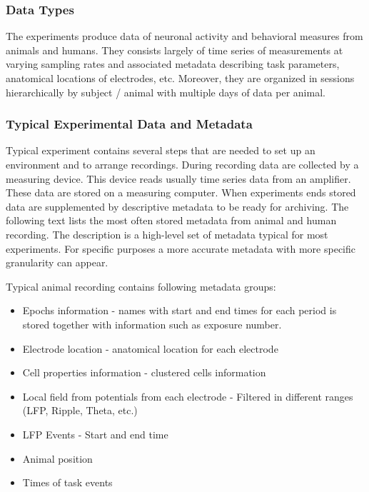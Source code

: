 \documentclass[utf8]{frontiersSCNS} %
\begin{document}
\subsubsection{Data Types}
\label{data-types}

The experiments produce data of neuronal activity and behavioral measures from animals and humans. They consists largely of time series of measurements at varying sampling rates and associated metadata describing task parameters, anatomical locations of electrodes, etc. Moreover, they are organized in sessions hierarchically by subject / animal with multiple days of data per animal.

\subsubsection{Typical Experimental Data and Metadata}
\label{typical-data-analysis-steps}

Typical experiment contains several steps that are needed to set up an environment and to arrange recordings. During recording data are collected by a measuring device. This device reads usually time series data from an amplifier. These data are stored on a measuring computer. When experiments ends stored data are supplemented by descriptive metadata to be ready for archiving. The following text lists the most often stored metadata from animal and human recording. The description is a high-level set of metadata typical for most experiments. For specific purposes a more accurate metadata with more specific granularity can appear.

Typical animal recording contains following metadata groups:

\begin{itemize}
 \item Epochs information - names with start and end times for each period is stored together with information such as exposure number. 
 \item Electrode location - anatomical location for each electrode
 \item Cell properties information - clustered cells information
 \item Local field from potentials from each electrode - Filtered in different ranges (LFP, Ripple, Theta, etc.)
 \item LFP Events - Start and end time
 \item Animal position
 \item Times of task events
\end{itemize}
\end{document}
